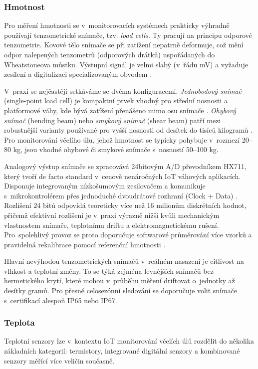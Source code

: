 \subsubsection*{Hmotnost}
Pro měření hmotnosti se v~monitorovacích systémech prakticky výhradně používají tenzometrické snímače, tzv. \textit{load cells}. Ty pracují na principu odporové tenzometrie. Kovové tělo snímače se při zatížení nepatrně deformuje, což mění odpor nalepených tenzometrů (odporových drátků) uspořádaných do Wheatstoneova můstku. Výstupní signál je velmi slabý (v~řádu mV) a vyžaduje zesílení a digitalizaci specializovaným obvodem \cite{Trent2017}.

V~praxi se nejčastěji setkáváme se dvěma konfiguracemi. \textit{Jednobodový snímač} (single-point load cell) je kompaktní prvek vhodný pro střední nosnosti a platformové váhy, kde bývá zatížení přenášeno mimo osu snímače \cite{singlePoint}. \textit{Ohybový snímač} (bending beam) nebo \textit{smykový snímač} (shear beam) patří mezi robustnější varianty používané pro vyšší nosnosti od desítek do tisíců kilogramů \cite{LoadCells}. Pro monitorování včelího úlu, jehož hmotnost se typicky pohybuje v~rozmezí 20--80 kg, jsou vhodné ohybové či smykové snímače s~nosností 50--100 kg.

Analogový výstup snímače se zpracovává 24bitovým A/D převodníkem HX711, který tvoří de facto standard v~cenově nenáročných IoT váhových aplikacích. Disponuje integrovaným nízkošumovým zesilovačem a komunikuje s~mikrokontrolérem přes jednoduché dvoudrátové rozhraní (Clock + Data) \cite{hx711}. Rozlišení 24 bitů odpovídá teoreticky více než 16 milionům diskrétních hodnot, přičemž efektivní rozlišení je v~praxi výrazně nižší kvůli mechanickým vlastnostem snímače, teplotnímu driftu a elektromagnetickému rušení. Pro~spolehlivý provoz se proto doporučuje softwarové průměrování více vzorků a pravidelná rekalibrace pomocí referenční hmotnosti \cite{Cecchi}.

Hlavní nevýhodou tenzometrických snímačů v~reálném nasazení je citlivost na vlhkost a teplotní změny. To se týká zejména levnějších snímačů bez hermetického krytí, které mohou v~průběhu měření driftovat o~jednotky až desítky gramů. Pro přesné celosezónní sledování se doporučuje volit snímače s~certifikací alespoň IP65 nebo IP67.

\subsubsection*{Teplota}
Teplotní senzory lze v~kontextu IoT monitorování včelích úlů rozdělit do několika základních kategorií: termistory, integrované digitální senzory a kombinované senzory měřící více veličin současně.

